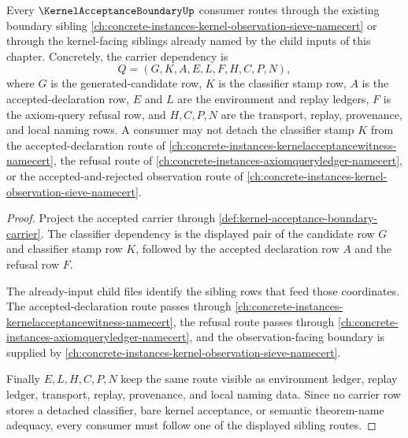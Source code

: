 \begin{theorem}
\label{thm:kernel-acceptance-boundary-sibling-route}
Every $\KernelAcceptanceBoundaryUp$ consumer routes through the existing boundary sibling \autoref{ch:concrete-instances-kernel-observation-sieve-namecert} or through the kernel-facing siblings already named by the child inputs of this chapter. Concretely, the carrier dependency is
$$
Q=(G,K,A,E,L,F,H,C,P,N),
$$
where $G$ is the generated-candidate row, $K$ is the classifier stamp row, $A$ is the accepted-declaration row, $E$ and $L$ are the environment and replay ledgers, $F$ is the axiom-query refusal row, and $H,C,P,N$ are the transport, replay, provenance, and local naming rows. A consumer may not detach the classifier stamp $K$ from the accepted-declaration route of \autoref{ch:concrete-instances-kernelacceptancewitness-namecert}, the refusal route of \autoref{ch:concrete-instances-axiomqueryledger-namecert}, or the accepted-and-rejected observation route of \autoref{ch:concrete-instances-kernel-observation-sieve-namecert}.
\end{theorem}
\begin{proof}
Project the accepted carrier through \autoref{def:kernel-acceptance-boundary-carrier}. The classifier dependency is the displayed pair of the candidate row $G$ and classifier stamp row $K$, followed by the accepted declaration row $A$ and the refusal row $F$.

The already-input child files identify the sibling rows that feed those coordinates. The accepted-declaration route passes through \autoref{ch:concrete-instances-kernelacceptancewitness-namecert}, the refusal route passes through \autoref{ch:concrete-instances-axiomqueryledger-namecert}, and the observation-facing boundary is supplied by \autoref{ch:concrete-instances-kernel-observation-sieve-namecert}.

Finally $E,L,H,C,P,N$ keep the same route visible as environment ledger, replay ledger, transport, replay, provenance, and local naming data. Since no carrier row stores a detached classifier, bare kernel acceptance, or semantic theorem-name adequacy, every consumer must follow one of the displayed sibling routes.
\end{proof}
